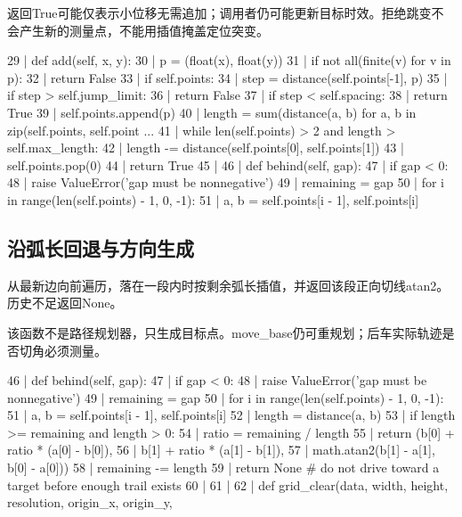 返回True可能仅表示小位移无需追加；调用者仍可能更新目标时效。拒绝跳变不会产生新的测量点，不能用插值掩盖定位突变。
\begin{CodeBlock}
  29 |     def add(self, x, y):
  30 |         p = (float(x), float(y))
  31 |         if not all(finite(v) for v in p):
  32 |             return False
  33 |         if self.points:
  34 |             step = distance(self.points[-1], p)
  35 |             if step > self.jump_limit:
  36 |                 return False
  37 |             if step < self.spacing:
  38 |                 return True
  39 |         self.points.append(p)
  40 |         length = sum(distance(a, b) for a, b in zip(self.points, self.point ...
  41 |         while len(self.points) > 2 and length > self.max_length:
  42 |             length -= distance(self.points[0], self.points[1])
  43 |             self.points.pop(0)
  44 |         return True
  45 | 
  46 |     def behind(self, gap):
  47 |         if gap < 0:
  48 |             raise ValueError('gap must be nonnegative')
  49 |         remaining = gap
  50 |         for i in range(len(self.points) - 1, 0, -1):
  51 |             a, b = self.points[i - 1], self.points[i]
\end{CodeBlock}
\subsection{沿弧长回退与方向生成}
从最新边向前遍历，落在一段内时按剩余弧长插值，并返回该段正向切线atan2。历史不足返回None。

该函数不是路径规划器，只生成目标点。move\_base仍可重规划；后车实际轨迹是否切角必须测量。
\begin{CodeBlock}
  46 |     def behind(self, gap):
  47 |         if gap < 0:
  48 |             raise ValueError('gap must be nonnegative')
  49 |         remaining = gap
  50 |         for i in range(len(self.points) - 1, 0, -1):
  51 |             a, b = self.points[i - 1], self.points[i]
  52 |             length = distance(a, b)
  53 |             if length >= remaining and length > 0:
  54 |                 ratio = remaining / length
  55 |                 return (b[0] + ratio * (a[0] - b[0]),
  56 |                         b[1] + ratio * (a[1] - b[1]),
  57 |                         math.atan2(b[1] - a[1], b[0] - a[0]))
  58 |             remaining -= length
  59 |         return None  # do not drive toward a target before enough trail exists
  60 | 
  61 | 
  62 | def grid_clear(data, width, height, resolution, origin_x, origin_y,
\end{CodeBlock}
